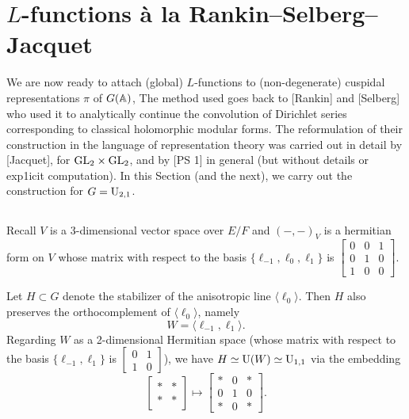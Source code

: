 \section{$L$-functions \`a la Rankin--Selberg--Jacquet}
\label{sec:3}


We are now ready to attach (global) $L$-functions to (non-degenerate) cuspidal representations $\pi$ of $G(\mathbb{A})$, The method used goes back to [Rankin] and [Selberg] who used it to analytically continue the convolution of Dirichlet series corresponding to classical holomorphic modular forms.
The reformulation of their construction in the language of representation theory was carried out in detail by [Jacquet], for $\mathrm{GL}_2 \times \mathrm{GL}_2$, and by [PS 1] in general (but without details or exp1icit computation).
In this Section (and the next), we carry out the construction for $G = \mathrm{U}_{2, 1}$.


\subsection{}
\label{sec:3.1}


Recall $V$ is a 3-dimensional vector space over $E/F$ and $(-,-)_V$ is a hermitian form on $V$ whose matrix with respect to the basis $\{\ell_{-1}, \ell_{0}, \ell_{1}\}$ is $\left[\begin{smallmatrix}
    0 & 0 & 1 \\ 0 & 1& 0 \\ 1 & 0 & 0
\end{smallmatrix}\right]$.

Let $H \subset G$ denote the stabilizer of the anisotropic line $\langle \ell_0 \rangle$.
Then $H$ also preserves the orthocomplement of $\langle \ell_0 \rangle$, namely
\[
    W = \langle \ell_{-1}, \ell_{1}\rangle.
\]
Regarding $W$ as a 2-dimensional Hermitian space (whose matrix with respect to the basis $\{\ell_{-1}, \ell_{1}\}$ is $\left[\begin{smallmatrix}
    0 & 1 \\ 1& 0
\end{smallmatrix}\right]$), we have $H \simeq \mathrm{U}(W) \simeq \mathrm{U}_{1, 1}$ via the embedding
\[
    \begin{bmatrix}
        * & * \\ * & *
    \end{bmatrix} \mapsto \begin{bmatrix}
        * & 0 & * \\ 0 & 1 & 0 \\ * & 0 & *
    \end{bmatrix}.
\]

